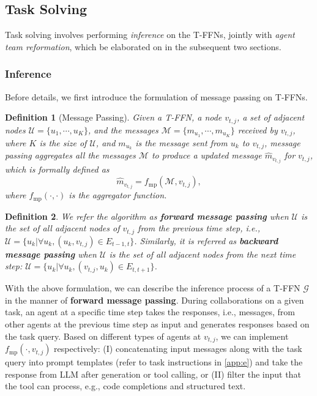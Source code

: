 \documentclass{article} %
\newtheorem{definition}{Definition}
\begin{document}
\subsection{Task Solving}\label{sec:task-solving}
Task solving involves performing \textit{inference} on the T-FFNs, jointly with \textit{agent team reformation}, which be elaborated on in the subsequent two sections.

\subsubsection{Inference}\label{sec:answer-infernece}
Before details, we first introduce the formulation of message passing on T-FFNs.

\begin{definition}[Message Passing]\label{def:message-passing}
    Given a T-FFN, a node $v_{t,j}$, a set of adjacent nodes $\mathcal{U}=\{u_1,\cdots,u_K\}$, and the messages $\mathcal{M}=\{m_{u_1}, \cdots, m_{u_K}\}$ received by $v_{t,j}$, where $K$ is the size of $\mathcal{U}$, and $m_{u_k}$ is the message sent from $u_k$ to $v_{t,j}$, message passing aggregates all the messages $\mathcal{M}$ to produce a updated message $\hat{m}_{v_{t,j}}$ for $v_{t,j}$, which is formally defined as
    \begin{equation}
        \hat{m}_{v_{t,j}} = f_{\mathrm{mp}}\left(\mathcal{M}, v_{t,j}\right),
    \end{equation}
    where $f_{\mathrm{mp}}(\cdot,\cdot)$ is the aggregator function.
\end{definition}

\begin{definition}\label{def:forward-backward}
    We refer the algorithm as {\bf forward message passing} when $\mathcal{U}$ is the set of all adjacent nodes of $v_{t,j}$ from the previous time step, i.e., $\mathcal{U}=\{u_k|\forall u_k, (u_k, v_{t,j})\in E_{t-1,t}\}$. Similarly, it is referred as {\bf backward message passing} when $\mathcal{U}$ is the set of all adjacent nodes from the next time step: $\mathcal{U}=\{u_k|\forall u_k, (v_{t,j}, u_k)\in E_{t, t+1}\}$.
\end{definition}

With the above formulation, we can describe the inference process of a T-FFN $\mathcal{G}$ in the manner of \textbf{forward message passing}. During collaborations on a given task, an agent at a specific time step takes the responses, i.e., messages, from other agents at the previous time step as input and generates responses based on the task query. 
Based on different types of agents at $v_{t,j}$, we can implement $f_{\mathrm{mp}}(\cdot, v_{t,j})$ respectively: (I) concatenating input messages along with the task query into prompt templates (refer to task instructions in \cref{app:e}) and take the response from LLM after generation or tool calling, 
or (II) filter the input that the tool can process, e.g., code completions and structured text. 
\end{document}
